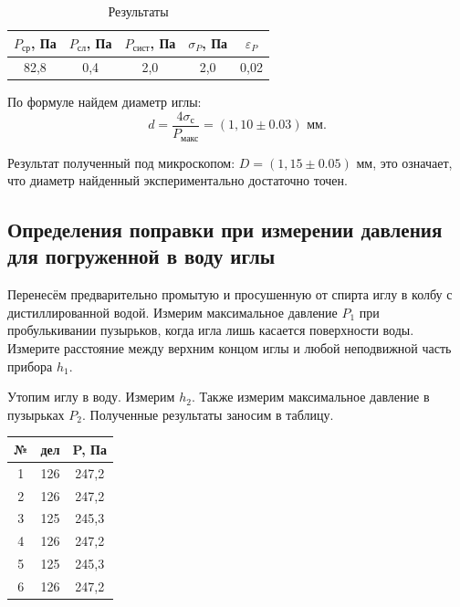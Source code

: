 \documentclass[a4paper,12pt]{article}
\begin{document}
\begin{table}[H]
    \centering
    \begin{tabular}{|c|c|c|c|c|}
    \hline
        $P_{ср}$, Па & $P_{сл}$, Па & $P_{сист}$, Па & $\sigma_P$, Па & $\varepsilon_P$ \\ \hline
        82,8 & 0,4 & 2,0 & 2,0 & 0,02 \\ \hline
    \end{tabular}
    \caption{Результаты}
\end{table}

По формуле найдем диаметр иглы:
	\begin{equation}
		d = \frac{4\sigma_{\text{с}}}{P_\text{макс}} = (1,10 \pm 0.03)\text{ мм}.
	\end{equation}
	
	Результат полученный под микроскопом: $D = (1,15\pm0.05)$ мм, это означает, что диаметр найденный экспериментально достаточно точен.
	
\subsection{Определения поправки при измерении давления для погруженной в воду иглы}

Перенесём предварительно промытую и просушенную от спирта иглу в колбу с дистиллированной водой. Измерим максимальное давление $ P_1 $ при пробулькивании пузырьков, когда игла лишь касается поверхности воды. Измерите расстояние между верхним концом иглы и любой неподвижной часть прибора $ h_1 $.

Утопим иглу в воду. Измерим $ h_2 $. Также измерим максимальное давление в пузырьках $ P_2 $. Полученные результаты заносим в таблицу.

\begin{table}[H]
    \centering
    \begin{tabular}{|c|c|c|}
    \hline
        № & дел & P, Па \\ \hline
        1 & 126 & 247,2 \\ \hline
        2 & 126 & 247,2 \\ \hline
        3 & 125 & 245,3 \\ \hline
        4 & 126 & 247,2 \\ \hline
        5 & 125 & 245,3 \\ \hline
        6 & 126 & 247,2 \\ \hline
    \end{tabular}
\end{table}
\end{document}
